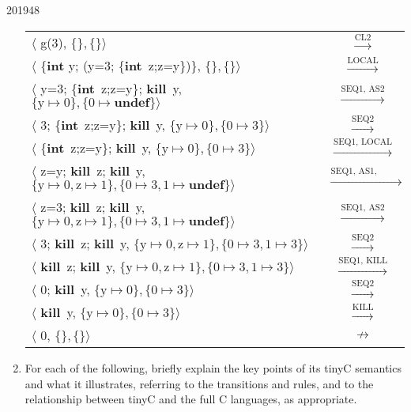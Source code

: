 \documentclass[10pt,\jkfside,a4paper]{article}
\begin{document}
\begin{examquestion}{2019}{4}{8}
\begin{enumerate}
\begin{center}
\begin{tabular}{l c}
$ \langle$ g(3), $\{\}, \{\} \rangle $ &
$\stackrel{\text{CL2}}{\to}$ \\
$ \langle$ \{\textbf{int} y; (y=3; \{\textbf{int}~z;z=y\})\}, $\{\}, \{\}
\rangle $ &
$\stackrel{\text{LOCAL}}{\to}$ \\
$ \langle$ y=3; \{\textbf{int}~z;z=y\}; \textbf{kill}~y, $\{\text{y}\mapsto
0\}, \{0\mapsto \textbf{undef}\} \rangle $ &
$\stackrel{\text{SEQ1, AS2}}{\to}$ \\
$ \langle$ 3; \{\textbf{int}~z;z=y\}; \textbf{kill}~y, $\{\text{y}\mapsto
0\}, \{0\mapsto 3\} \rangle $ &
$\stackrel{\text{SEQ2}}{\to}$ \\
$ \langle$ \{\textbf{int}~z;z=y\}; \textbf{kill}~y, $\{\text{y}\mapsto
0\}, \{0\mapsto 3\} \rangle $ &
$\stackrel{\text{SEQ1, LOCAL}}{\to}$ \\
$ \langle$ z=y; \textbf{kill}~z; \textbf{kill}~y, $\{\text{y}\mapsto
0, \text{z}\mapsto 1\}, \{0\mapsto 3, 1\mapsto\textbf{undef}\} \rangle $ &
$\stackrel{\text{SEQ1, AS1, DEREF}}{\to}$ \\
$ \langle$ z=3; \textbf{kill}~z; \textbf{kill}~y, $\{\text{y}\mapsto
0, \text{z}\mapsto 1\}, \{0\mapsto 3, 1\mapsto\textbf{undef}\} \rangle $ &
$\stackrel{\text{SEQ1, AS2}}{\to}$ \\
$ \langle$ 3; \textbf{kill}~z; \textbf{kill}~y, $\{\text{y}\mapsto
0, \text{z}\mapsto 1\}, \{0\mapsto 3, 1\mapsto3\} \rangle $ &
$\stackrel{\text{SEQ2}}{\to}$ \\
$ \langle$ \textbf{kill}~z; \textbf{kill}~y, $\{\text{y}\mapsto
0, \text{z}\mapsto 1\}, \{0\mapsto 3, 1\mapsto3\} \rangle $ &
$\stackrel{\text{SEQ1, KILL}}{\to}$ \\
$ \langle$ 0; \textbf{kill}~y, $\{\text{y}\mapsto
0\}, \{0\mapsto 3\} \rangle $ &
$\stackrel{\text{SEQ2}}{\to}$ \\
$ \langle$ \textbf{kill}~y, $\{\text{y}\mapsto
0\}, \{0\mapsto 3\} \rangle $ &
$\stackrel{\text{KILL}}{\to}$ \\
$ \langle$ 0, $\{\}, \{\} \rangle $ &
$\not\to$ \\
\end{tabular}
\end{center}

\item For each of the following, briefly explain the key points of its tinyC
semantics and what it illustrates, referring to the transitions and rules,
and to the relationship between tinyC and the full C languages, as appropriate.


\end{enumerate}
\end{examquestion}
\end{document}
